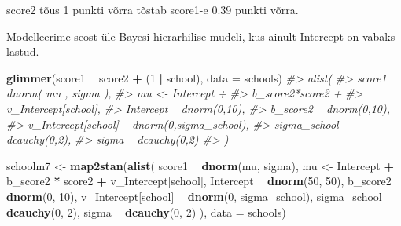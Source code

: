 \documentclass[]{book}
\newenvironment{Shaded}{\begin{snugshade}}{\end{snugshade}}
\newcommand{\KeywordTok}[1]{\textcolor[rgb]{0.13,0.29,0.53}{\textbf{#1}}}
\newcommand{\DataTypeTok}[1]{\textcolor[rgb]{0.13,0.29,0.53}{#1}}
\newcommand{\DecValTok}[1]{\textcolor[rgb]{0.00,0.00,0.81}{#1}}
\newcommand{\StringTok}[1]{\textcolor[rgb]{0.31,0.60,0.02}{#1}}
\newcommand{\CommentTok}[1]{\textcolor[rgb]{0.56,0.35,0.01}{\textit{#1}}}
\newcommand{\OperatorTok}[1]{\textcolor[rgb]{0.81,0.36,0.00}{\textbf{#1}}}
\newcommand{\NormalTok}[1]{#1}
\begin{document}
score2 tõus 1 punkti võrra tõstab score1-e 0.39 punkti võrra.

Modelleerime seost üle Bayesi hierarhilise mudeli, kus ainult Intercept
on vabaks lastud.

\begin{Shaded}
\begin{Highlighting}[]
\KeywordTok{glimmer}\NormalTok{(score1 }\OperatorTok{~}\StringTok{ }\NormalTok{score2 }\OperatorTok{+}\StringTok{ }\NormalTok{(}\DecValTok{1} \OperatorTok{|}\StringTok{ }\NormalTok{school), }\DataTypeTok{data =}\NormalTok{ schools)}
\CommentTok{#> alist(}
\CommentTok{#>     score1 ~ dnorm( mu , sigma ),}
\CommentTok{#>     mu <- Intercept +}
\CommentTok{#>         b_score2*score2 +}
\CommentTok{#>         v_Intercept[school],}
\CommentTok{#>     Intercept ~ dnorm(0,10),}
\CommentTok{#>     b_score2 ~ dnorm(0,10),}
\CommentTok{#>     v_Intercept[school] ~ dnorm(0,sigma_school),}
\CommentTok{#>     sigma_school ~ dcauchy(0,2),}
\CommentTok{#>     sigma ~ dcauchy(0,2)}
\CommentTok{#> )}
\end{Highlighting}
\end{Shaded}

\begin{Shaded}
\begin{Highlighting}[]
\NormalTok{schoolm7 <-}\StringTok{ }\KeywordTok{map2stan}\NormalTok{(}\KeywordTok{alist}\NormalTok{(}
\NormalTok{    score1 }\OperatorTok{~}\StringTok{ }\KeywordTok{dnorm}\NormalTok{(mu, sigma),}
\NormalTok{    mu <-}\StringTok{ }\NormalTok{Intercept }\OperatorTok{+}
\StringTok{        }\NormalTok{b_score2 }\OperatorTok{*}\StringTok{ }\NormalTok{score2 }\OperatorTok{+}
\StringTok{        }\NormalTok{v_Intercept[school],}
\NormalTok{    Intercept }\OperatorTok{~}\StringTok{ }\KeywordTok{dnorm}\NormalTok{(}\DecValTok{50}\NormalTok{, }\DecValTok{50}\NormalTok{),}
\NormalTok{    b_score2 }\OperatorTok{~}\StringTok{ }\KeywordTok{dnorm}\NormalTok{(}\DecValTok{0}\NormalTok{, }\DecValTok{10}\NormalTok{),}
\NormalTok{    v_Intercept[school] }\OperatorTok{~}\StringTok{ }\KeywordTok{dnorm}\NormalTok{(}\DecValTok{0}\NormalTok{, sigma_school),}
\NormalTok{    sigma_school }\OperatorTok{~}\StringTok{ }\KeywordTok{dcauchy}\NormalTok{(}\DecValTok{0}\NormalTok{, }\DecValTok{2}\NormalTok{),}
\NormalTok{    sigma }\OperatorTok{~}\StringTok{ }\KeywordTok{dcauchy}\NormalTok{(}\DecValTok{0}\NormalTok{, }\DecValTok{2}\NormalTok{)}
\NormalTok{), }\DataTypeTok{data =}\NormalTok{ schools)}
\end{Highlighting}
\end{Shaded}
\end{document}
